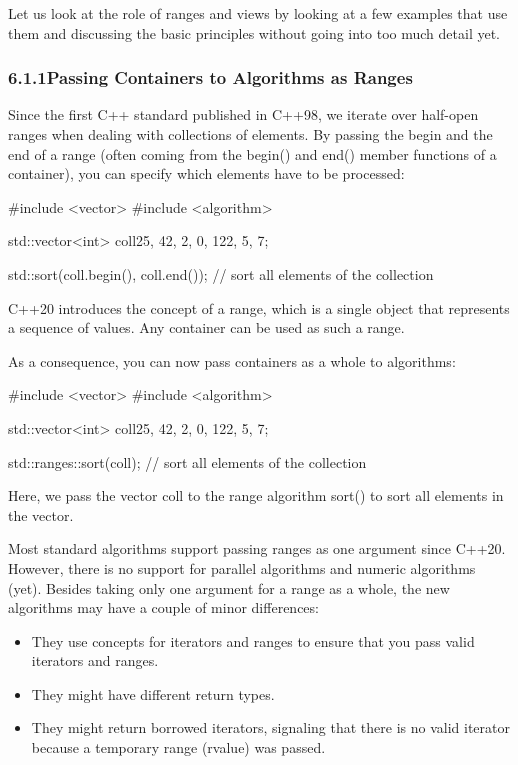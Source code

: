 

Let us look at the role of ranges and views by looking at a few examples that use them and discussing the basic principles without going into too much detail yet.

\subsubsection*{ 6.1.1\hspace{0.2cm}Passing Containers to Algorithms as Ranges}

Since the first C++ standard published in C++98, we iterate over half-open ranges when dealing with collections of elements. By passing the begin and the end of a range (often coming from the begin() and end() member functions of a container), you can specify which elements have to be processed:

\begin{cpp}
#include <vector>
#include <algorithm>

std::vector<int> coll{25, 42, 2, 0, 122, 5, 7};

std::sort(coll.begin(), coll.end()); // sort all elements of the collection
\end{cpp}

C++20 introduces the concept of a range, which is a single object that represents a sequence of values. Any container can be used as such a range.

As a consequence, you can now pass containers as a whole to algorithms:

\begin{cpp}
#include <vector>
#include <algorithm>

std::vector<int> coll{25, 42, 2, 0, 122, 5, 7};

std::ranges::sort(coll); // sort all elements of the collection
\end{cpp}

Here, we pass the vector coll to the range algorithm sort() to sort all elements in the vector.

Most standard algorithms support passing ranges as one argument since C++20. However, there is no support for parallel algorithms and numeric algorithms (yet). Besides taking only one argument for a range as a whole, the new algorithms may have a couple of minor differences:

\begin{itemize}
\item
They use concepts for iterators and ranges to ensure that you pass valid iterators and ranges.

\item
They might have different return types.

\item
They might return borrowed iterators, signaling that there is no valid iterator because a temporary range (rvalue) was passed.
\end{itemize}

